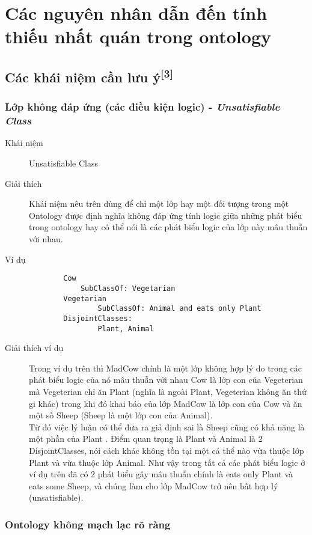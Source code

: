 \chapter{Các nguyên nhân dẫn đến tính thiếu nhất quán  trong ontology}

\section{Các khái niệm cần lưu ý\textsuperscript{[3]}}
\subsection{Lớp không đáp ứng (các điều kiện logic) - \textit{Unsatisfiable Class}}
\begin{description}
\item[Khái niệm]	Unsatisfiable Class
\item[Giải thích] Khái niệm nêu trên dùng để chỉ một lớp hay một đối tượng trong một Ontology được định nghĩa không đáp ứng tính logic giữa những phát biểu trong ontology hay có thể nói là các phát biểu logic của lớp này mâu thuẫn với nhau.
\item[Ví dụ]
\begin{verbatim}
		Cow
   	 		SubClassOf: Vegetarian
		Vegetarian
    			SubClassOf: Animal and eats only Plant
		DisjointClasses:
    			Plant, Animal
\end{verbatim}
\item[Giải thích ví dụ]
Trong ví dụ trên thì MadCow chính là một lớp không hợp lý do trong các phát biểu logic của nó mâu thuẫn với nhau Cow là lớp con của Vegeterian mà Vegeterian chỉ ăn Plant (nghĩa là ngoài Plant, Vegeterian không ăn thứ gi khác) trong khi đó khai báo của lớp MadCow là lớp con của Cow và ăn một số Sheep (Sheep là một lớp con của Animal).
\\ Từ đó việc lý luận có thể đưa ra giả định sai là Sheep cũng có khả năng là một phần của Plant . Điểm quan trọng là Plant và Animal là 2 DisjointClasses, nói cách khác không tồn tại một cá thể nào vừa thuộc lớp Plant và vừa thuộc lớp Animal. Như vậy trong tất cả các phát biểu logic ở ví dụ trên đã có 2 phát biểu gây mâu thuẫn chính là eats only Plant và eats some Sheep, và chúng làm cho lớp MadCow trở nên bất hợp lý (unsatisfiable).
\end{description}

\subsection{Ontology không mạch lạc rõ ràng}

